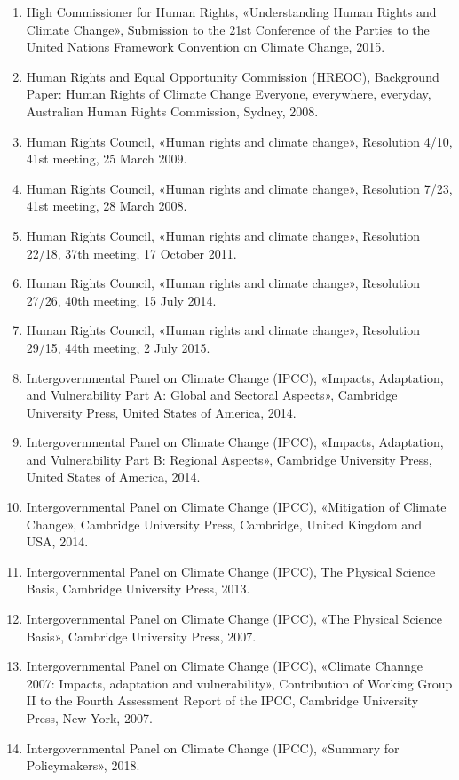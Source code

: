 {{{\begin{latin}
\begin{enumerate}
\item High Commissioner for Human Rights, «Understanding Human Rights and Climate Change», Submission to the 21st Conference of the Parties to the United Nations Framework Convention on Climate Change, 2015.
\item Human Rights and Equal Opportunity Commission (HREOC), Background Paper: Human Rights of Climate Change Everyone, everywhere, everyday, Australian Human Rights Commission, Sydney, 2008.
\item Human Rights Council, «Human rights and climate change», Resolution 4/10, 41st meeting, 25 March 2009.
\item Human Rights Council, «Human rights and climate change», Resolution 7/23, 41st meeting, 28 March 2008.
\item Human Rights Council, «Human rights and climate change», Resolution 22/18, 37th meeting, 17 October 2011.
\item Human Rights Council, «Human rights and climate change», Resolution 27/26, 40th meeting, 15 July 2014.
\item Human Rights Council, «Human rights and climate change», Resolution 29/15, 44th meeting, 2 July 2015.
\item Intergovernmental Panel on Climate Change  (IPCC), «Impacts, Adaptation, and Vulnerability Part A: Global and Sectoral Aspects», Cambridge University Press, United States of America, 2014.
\item Intergovernmental Panel on Climate Change  (IPCC), «Impacts, Adaptation, and Vulnerability Part B: Regional Aspects», Cambridge University Press, United States of America, 2014.
\item Intergovernmental Panel on Climate Change  (IPCC), «Mitigation of Climate Change», Cambridge University Press, Cambridge, United Kingdom and USA, 2014.
\item Intergovernmental Panel on Climate Change  (IPCC), The Physical Science Basis, Cambridge University Press, 2013.
\item Intergovernmental Panel on Climate Change (IPCC),  «The Physical Science Basis», Cambridge University Press, 2007.
\item Intergovernmental Panel on Climate Change (IPCC), «Climate Channge 2007: Impacts, adaptation and vulnerability», Contribution of Working Group II to the Fourth Assessment Report of the IPCC, Cambridge University Press, New York, 2007. 
\item Intergovernmental Panel on Climate Change (IPCC), «Summary for Policymakers», 2018.

\end{enumerate}
\end{latin}}}}
